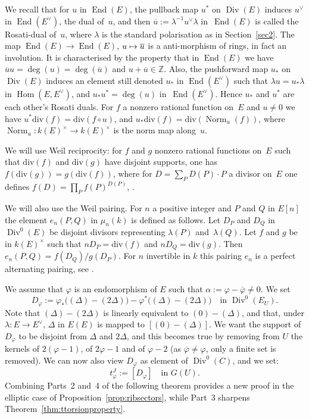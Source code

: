 \documentclass[JEP,XML,SOM,Unicode,NoFloatCountersInSection]{cedram}
\def\mto{\mathchoice{\longmapsto}{\mapsto}{\mapsto}{\mapsto}}
\let\oldvee\vee
\renewcommand{\vee}{{\scriptscriptstyle\oldvee}}
\theoremstyle{plain}
\theoremstyle{definition}
\numberwithin{equation}{subsection}
\let\ol\overline
\let\phi\varphi
\newcommand{\Z}{\mathbb Z}
\newcommand{\divisor}{\mathrm{div}}
\DeclareMathOperator{\Div}{Div}
\DeclareMathOperator{\End}{End}
\DeclareMathOperator{\Hom}{Hom}
\DeclareMathOperator{\Norm}{Norm}
\begin{document}
We recall that for $u$ in $\End(E)$, the pullback map $u^*$ on
$\Div(E)$ induces $u^\vee$ in $\End(E^\vee)$, the dual of~$u$, and
then $\ol{u}:=\lambda^{-1} u^\vee\lambda$ in~$\End(E)$ is called the
Rosati-dual of~$u$, where $\lambda$ is the standard polarisation as in
Section~\ref{sec2}. The map $\End(E)\to\End(E)$, $u\mto \ol{u}$ is
a anti-morphism of rings, in fact an involution. It is characterised
by the property that in $\End(E)$ we have
$\ol{u}u=\deg(u)=\deg(\ol{u})$ and $u+\ol{u}\in\Z$. Also, the
pushforward map $u_*$ on $\Div(E)$ induces an element still denoted
$u_*$ in $\End(E^\vee)$ such that $\lambda u=u_*\lambda$ in $\Hom(E,
E^\vee)$, and $u_*u^*=\deg(u)$ in~$\End(E^\vee)$. Hence $u_*$ and
$u^*$ are each other's Rosati duals. For $f$ a nonzero rational function
on~$E$ and $u\neq 0$ we have $u^*\divisor(f)=\divisor(f\circ u)$, and
$u_*\divisor(f)=\divisor(\Norm_u(f))$, where $\Norm_u\colon
k(E)^\times\to k(E)^\times$ is the norm map along~$u$.

We will use Weil reciprocity: for $f$ and $g$ nonzero rational
functions on~$E$ such that $\divisor(f)$ and $\divisor(g)$ have
disjoint supports, one has $f(\divisor(g))=g(\divisor(f))$, where for
$D=\sum_PD(P){\cdot}P$ a divisor on~$E$ one defines
$f(D)=\prod_Pf(P)^{D(P)}$, \cf \cite[III, Prop.\,7]{Serre}.

We will also use the Weil pairing. For $n$ a positive integer and $P$
and $Q$ in $E[n]$ the element $e_n(P,Q)$ in $\mu_n(k)$ is defined as
follows. Let $D_P$ and $D_Q$ in $\Div^0(E)$ be disjoint divisors
representing $\lambda(P)$ and~$\lambda(Q)$. Let $f$ and $g$ be in
$k(E)^\times$ such that $nD_P=\divisor(f)$ and
$nD_Q=\divisor(g)$. Then $e_n(P,Q)=f(D_Q)/g(D_P)$. For $n$ invertible
in $k$ this pairing $e_n$ is a perfect alternating pairing, see
\cite[Chap.\,12, Rem.\,3.7]{Husemoller}.

We assume that $\phi$ is an endomorphism of $E$ such that
$\alpha:=\phi-\ol{\phi}\neq 0$. We set
\begin{equation}
\label{eq:def_D}
D_\phi := \phi_*\big((\Delta)-(2\Delta)\big) -
\phi^*\big((\Delta)-(2\Delta)\big)
\quad\text{in $\Div^0(E_U)$}.
\end{equation}
Note that $(\Delta)-(2\Delta)$ is linearly equivalent to
$(0)-(\Delta)$, and that, under $\lambda\colon E\to E^\vee$, $\Delta$
in $E(E)$ is mapped to $[(0)-(\Delta)]$.
We want the support of $D_\phi$ to be disjoint from $\Delta$ and
$2\Delta$, and this becomes true by removing from $U$ the kernels of
$2(\phi-1)$, of $2\phi-1$ and of $\phi-2$ (as $\ol{\phi}\neq\phi$,
only a finite set is removed). We can now also view $D_\phi$ as
element of $\Div^0(C)$, and we set:
\begin{equation}
\label{eq:def_sJ}
t^J_\phi := [D_\phi] \quad\text{in $G(U)$.}
\end{equation}
Combining Parts~2 and~4 of the following theorem
provides a new proof in the elliptic case of Proposition~\ref{prop:ribsectors},
while Part~3 sharpens Theorem~\ref{thm:ttorsionproperty}.
\end{document}
